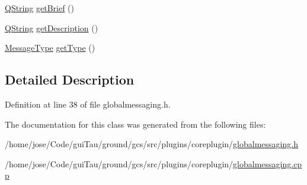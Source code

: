 \begin{DoxyCompactItemize}
\item 
\hyperlink{group___u_a_v_objects_plugin_gab9d252f49c333c94a72f97ce3105a32d}{Q\-String} \hyperlink{group___core_plugin_ga26d2a51122184b81f51d6ed401efc997}{get\-Brief} ()
\item 
\hyperlink{group___u_a_v_objects_plugin_gab9d252f49c333c94a72f97ce3105a32d}{Q\-String} \hyperlink{group___core_plugin_gae6a7c0268d0400189aab24dfe2a85c60}{get\-Description} ()
\item 
\hyperlink{group___core_plugin_ga51bd6651e9cc7b45aeaff9bd5991be3d}{Message\-Type} \hyperlink{group___core_plugin_gab882a1abe22056db73914f652e329048}{get\-Type} ()
\end{DoxyCompactItemize}


\subsection{Detailed Description}


Definition at line 38 of file globalmessaging.\-h.



The documentation for this class was generated from the following files\-:\begin{DoxyCompactItemize}
\item 
/home/jose/\-Code/gui\-Tau/ground/gcs/src/plugins/coreplugin/\hyperlink{globalmessaging_8h}{globalmessaging.\-h}\item 
/home/jose/\-Code/gui\-Tau/ground/gcs/src/plugins/coreplugin/\hyperlink{globalmessaging_8cpp}{globalmessaging.\-cpp}\end{DoxyCompactItemize}
